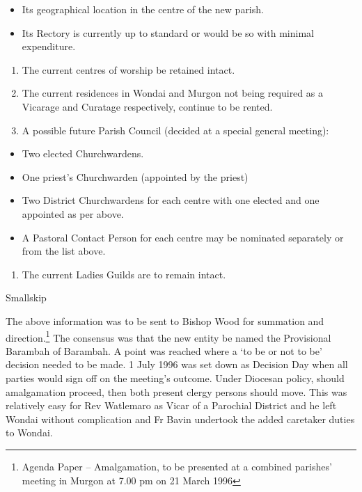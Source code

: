 \begin{itemize}
\item
  Its geographical location in the centre of the new parish.
\item
  Its Rectory is currently up to standard or would be so with minimal expenditure.
\end{itemize}

\begin{enumerate}
\def\labelenumi{\arabic{enumi}.}
\setcounter{enumi}{2}
\item
  The current centres of worship be retained intact.
\item
  The current residences in Wondai and Murgon not being required as a Vicarage and Curatage respectively, continue to be rented.
\item
  A possible future Parish Council (decided at a special general meeting):
\end{enumerate}

\begin{itemize}
\item
  Two elected Churchwardens.
\item
  One priest's Churchwarden (appointed by the priest)
\item
  Two District Churchwardens for each centre with one elected and one appointed as per above.
\item
  A Pastoral Contact Person for each centre may be nominated separately or from the list above.
\end{itemize}

\begin{enumerate}
\def\labelenumi{\arabic{enumi}.}
\setcounter{enumi}{5}
\item
  The current Ladies Guilds are to remain intact.
\end{enumerate}

Smallskip

The above information was to be sent to Bishop Wood for summation and direction.\footnote{Agenda Paper -- Amalgamation, to be presented at a combined parishes' meeting in Murgon at 7.00 pm on 21 March 1996} The consensus was that the new entity be named the Provisional Barambah of Barambah. A point was reached where a `to be or not to be' decision needed to be made. 1 July 1996 was set down as Decision Day when all parties would sign off on the meeting's outcome. Under Diocesan policy, should amalgamation proceed, then both present clergy persons should move. This was relatively easy for Rev Watlemaro as Vicar of a Parochial District and he left Wondai without complication and Fr Bavin undertook the added caretaker duties to Wondai.

